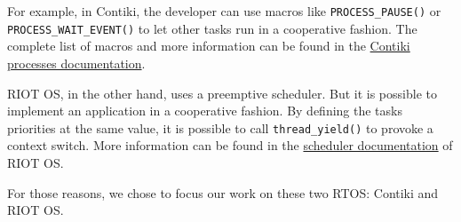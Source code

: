 
For example, in Contiki, the developer can use macros like \texttt{PROCESS\_PAUSE()} or \texttt{PROCESS\_WAIT\_EVENT()} to let other tasks run in a cooperative fashion.
The complete list of macros and more information can be found in the \href{https://github.com/contiki-os/contiki/wiki/Processes}{Contiki processes documentation}.

RIOT OS, in the other hand, uses a preemptive scheduler.
But it is possible to implement an application in a cooperative fashion.
By defining the tasks priorities at the same value, it is possible to call \texttt{thread\_yield()} to provoke a context switch.
More information can be found in the \href{https://riot-os.org/api/group__core__sched.html}{scheduler documentation} of RIOT OS.

For those reasons, we chose to focus our work on these two RTOS: Contiki and RIOT OS.
